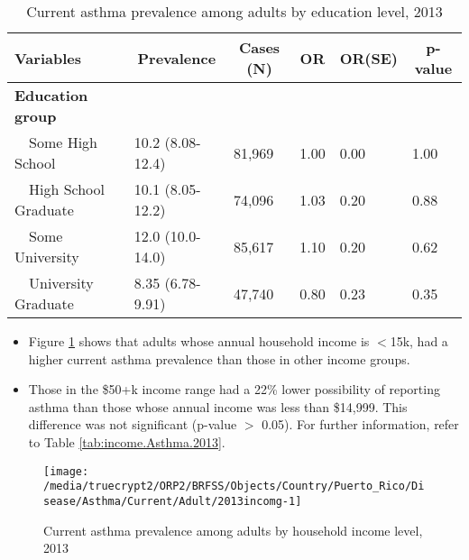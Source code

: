\begin{table}[H]
\caption{Current asthma prevalence  among adults by education level, 2013\label{tab:edu.Asthma.2013}} 
\begin{center}
\begin{tabular}{llllll}
\hline\hline
\multicolumn{1}{l}{Variables}&\multicolumn{1}{c}{Prevalence}&\multicolumn{1}{c}{Cases (N)}&\multicolumn{1}{c}{OR}&\multicolumn{1}{c}{OR(SE)}&\multicolumn{1}{c}{p-value}\tabularnewline
\hline
{\bfseries Education group}&&&&&\tabularnewline
~~Some High School&10.2 (8.08-12.4)&81,969&1.00&0.00&1.00\tabularnewline
~~High School Graduate&10.1 (8.05-12.2)&74,096&1.03&0.20&0.88\tabularnewline
~~Some University&12.0 (10.0-14.0)&85,617&1.10&0.20&0.62\tabularnewline
~~University Graduate&8.35 (6.78-9.91)&47,740&0.80&0.23&0.35\tabularnewline
\hline
\end{tabular}\end{center}

\end{table}

 
 
 \newpage
\begin{itemize}

\item Figure \ref{fig:income.Asthma.2013} shows that adults whose annual household income is 
$<$15k, had a higher current asthma prevalence than those in other income groups.

\item Those in the \$50+k income range had a 22\% lower possibility of reporting asthma than those whose annual income was less than \$14,999. This difference was not significant (p-value $>$ 0.05).  For further information, refer to Table \ref{tab:income.Asthma.2013}.

\end{itemize}

\begin{figure}[H]
\caption{Current asthma prevalence among adults by household income level, 
         2013}
\begin{knitrout}
\color{fgcolor}

{\centering \texttt{[image: /media/truecrypt2/ORP2/BRFSS/Objects/Country/Puerto\_Rico/Disease/Asthma/Current/Adult/2013incomg-1]} 

}



\end{knitrout}
 \label{fig:income.Asthma.2013}
\end{figure}

